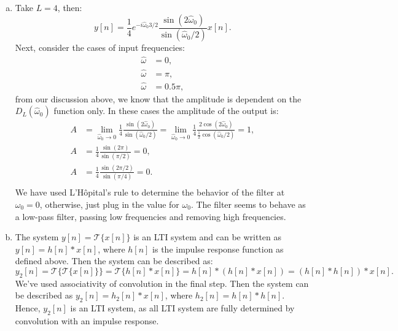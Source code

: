 \begin{enumerate}
\begin{enumerate}[a)]
\item Take $L=4$, then:
$$y[n]=\frac{1}{4}e^{-i\hat{\omega}_{0}3/2}\frac{\sin(2\hat{\omega}_{0})}{\sin(\hat{\omega}_{0}/2)}x[n].$$
Next, consider the cases of input frequencies:
\begin{align*}
    \hat{\omega}&=0,\\
    \hat{\omega}&=\pi,\\
    \hat{\omega}&=0.5\pi,
\end{align*}
from our discussion above, we know that the amplitude is dependent on the $D_{L}(\hat{\omega}_{0})$ function only. 
In these cases the amplitude of the output is:
\begin{align*}
    A&=\lim_{\hat{\omega}_{0}\to 0}\frac{1}{4}\frac{\sin(2\hat{\omega}_{0})}{\sin(\hat{\omega}_{0}/2)} = \lim_{\hat{\omega}_{0}\to 0}\frac{1}{4}\frac{2\cos(2\hat{\omega}_{0})}{\frac{1}{2}\cos(\hat{\omega}_{0}/2)} = 1, \\
    A&=\frac{1}{4}\frac{\sin(2\pi)}{\sin(\pi/2)} = 0,\\
    A&=\frac{1}{4}\frac{\sin(2\pi/2)}{\sin(\pi/4)} = 0.\\
\end{align*}
We have used L'Hôpital's rule to determine the behavior of the filter at $\omega_{0} = 0$, otherwise, just plug in the value for $\omega_0$. 
The filter seems to behave as a low-pass filter, passing low frequencies and removing high frequencies.  

\item The system $y[n]=\mathcal{T}\{x[n]\}$ is an LTI system and can be written as $y[n]=h[n]*x[n]$, where $h[n]$ is the impulse response function as defined above. 
Then the system can be described as:
$$y_{2}[n]=\mathcal{T}\{\mathcal{T}\{x[n]\}\}=\mathcal{T}\{h[n]*x[n]\}=h[n]*(h[n]*x[n])=(h[n]*h[n])*x[n].$$
We've used associativity of convolution in the final step. Then the system can be described as $y_{2}[n]=h_{2}[n]*x[n]$, 
where $h_{2}[n]=h[n]*h[n]$. Hence, $y_{2}[n]$ is an LTI system, as all LTI system are fully determined by convolution with an impulse response. 


\end{enumerate}
\end{enumerate}
